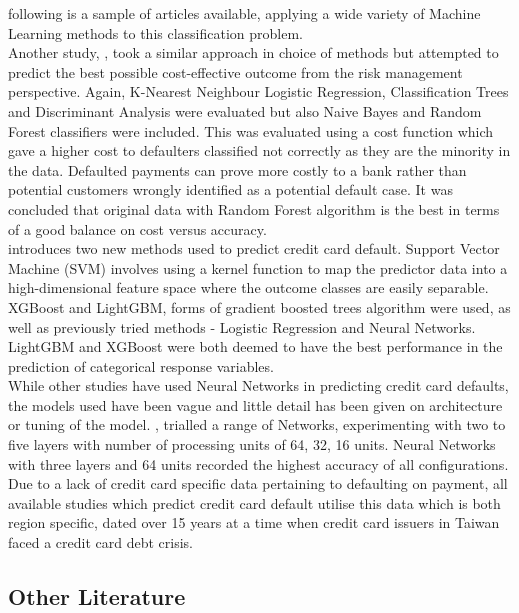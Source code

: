 \documentclass[
]{article}
\begin{document}
following is a sample of articles available, applying a wide variety of
Machine Learning methods to this classification problem.\\
Another study, \citep{Neema2017TheCO}, took a similar approach in choice
of methods but attempted to predict the best possible cost-effective
outcome from the risk management perspective. Again, K-Nearest Neighbour
Logistic Regression, Classification Trees and Discriminant Analysis were
evaluated but also Naive Bayes and Random Forest classifiers were
included. This was evaluated using a cost function which gave a higher
cost to defaulters classified not correctly as they are the minority in
the data. Defaulted payments can prove more costly to a bank rather than
potential customers wrongly identified as a potential default case. It
was concluded that original data with Random Forest algorithm is the
best in terms of a good balance on cost versus accuracy.\\
\citet{Yang2018-rt} introduces two new methods used to predict credit
card default. Support Vector Machine (SVM) involves using a kernel
function to map the predictor data into a high-dimensional feature space
where the outcome classes are easily separable. XGBoost and LightGBM,
forms of gradient boosted trees algorithm were used, as well as
previously tried methods - Logistic Regression and Neural Networks.
LightGBM and XGBoost were both deemed to have the best performance in
the prediction of categorical response variables.\\
While other studies have used Neural Networks in predicting credit card
defaults, the models used have been vague and little detail has been
given on architecture or tuning of the model. \citet{dnn2}, trialled a
range of Networks, experimenting with two to five layers with number of
processing units of 64, 32, 16 units. Neural Networks with three layers
and 64 units recorded the highest accuracy of all configurations.\\
\vspace{.5 cm} Due to a lack of credit card specific data pertaining to
defaulting on payment, all available studies which predict credit card
default utilise this data which is both region specific, dated over 15
years at a time when credit card issuers in Taiwan faced a credit card
debt crisis.

\hypertarget{other-literature}{%
\subsection{Other Literature}\label{other-literature}}
\end{document}
